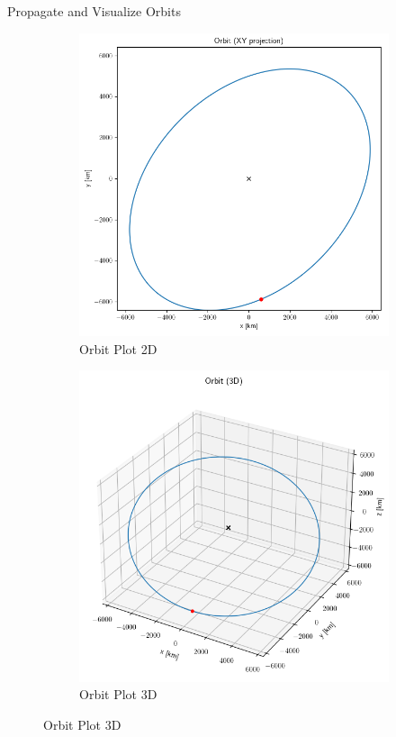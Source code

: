 \begin{hwkProblem}{4}{Propagate and Visualize Orbits}
	\begin{figure}[H] \label{fig:s04a}
		\begin{subfigure}{0.5\textwidth} \label{fig:s04a1}
			\begin{center}
				\includegraphics[width=\linewidth]{./images/s04a1.png}
			\end{center}
			\caption{Orbit Plot 2D}
		\end{subfigure}
		\begin{subfigure}{0.5\textwidth} \label{fig:s04a2}
			\begin{center}
				\includegraphics[width=\linewidth]{./images/s04a2.png}
			\end{center}
			\caption{Orbit Plot 3D}
		\end{subfigure}
	\end{figure}


\end{hwkProblem}
